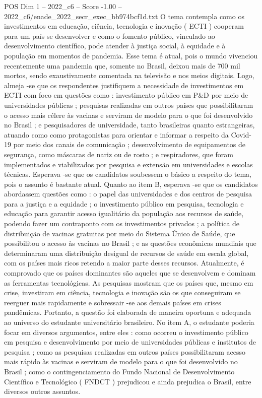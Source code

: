 \begin{textsample}{POS Dim 1 – 2022\_c6 – Score -1.00 – 2022\_c6/enade\_2022\_secr\_exec\_bb974bcf1d.txt}
O tema contempla como os investimentos em educação, ciência, tecnologia e inovação ( ECTI ) cooperam para um país se desenvolver e como o fomento público, vinculado ao desenvolvimento científico, pode atender à justiça social, à equidade e à população em momentos de pandemia.
Esse tema é atual, pois o mundo vivenciou recentemente uma pandemia que, somente no Brasil, deixou mais de 700 mil mortos, sendo exaustivamente comentada na televisão e nos meios digitais.
Logo, almeja -se que os respondentes justifiquem a necessidade de investimentos em ECTI com foco em questões como : investimento público em P\&D por meio de universidades públicas ; pesquisas realizadas em outros países que possibilitaram o acesso mais célere às vacinas e serviram de modelo para o que foi desenvolvido no Brasil ; e pesquisadores de universidade, tanto brasileiras quanto estrangeiras, atuando como como protagonistas para orientar e informar a respeito da Covid-19 por meio dos canais de comunicação ; desenvolvimento de equipamentos de segurança, como máscaras de nariz ou de rosto ; e respiradores, que foram implementados e viabilizados por pesquisa e extensão em universidades e escolas técnicas.
Esperava -se que os candidatos soubessem o básico a respeito do tema, pois o assunto é bastante atual.
Quanto ao item B, esperava -se que os candidatos abordassem questões como : o papel das universidades e dos centros de pesquisa para a justiça e a equidade ; o investimento público em pesquisa, tecnologia e educação para garantir acesso igualitário da população aos recursos de saúde, podendo fazer um contraponto com os investimentos privados ; a política de distribuição de vacinas gratuitas por meio do Sistema Único de Saúde, que possibilitou o acesso às vacinas no Brasil ; e as questões econômicas mundiais que determinaram uma distribuição desigual de recursos de saúde em escala global, com os países mais ricos retendo a maior parte desses recursos.
Atualmente, é comprovado que os países dominantes são aqueles que se desenvolvem e dominam as ferramentas tecnológicas.
As pesquisas mostram que os países que, mesmo em crise, investiram em ciência, tecnologia e inovação são os que conseguiram se reerguer mais rapidamente e sobressair -se aos demais países em crises pandêmicas.
Portanto, a questão foi elaborada de maneira oportuna e adequada ao universo do estudante universitário brasileiro.
No item A, o estudante poderia focar em diversos argumentos, entre eles : como ocorreu o investimento público em pesquisa e desenvolvimento por meio de universidades públicas e institutos de pesquisa ; como as pesquisas realizadas em outros países possibilitaram acesso mais rápido às vacinas e serviram de modelo para o que foi desenvolvido no Brasil ; como o contingenciamento do Fundo Nacional de Desenvolvimento Científico e Tecnológico ( FNDCT ) prejudicou e ainda prejudica o Brasil, entre diversos outros assuntos.

\end{textsample}
